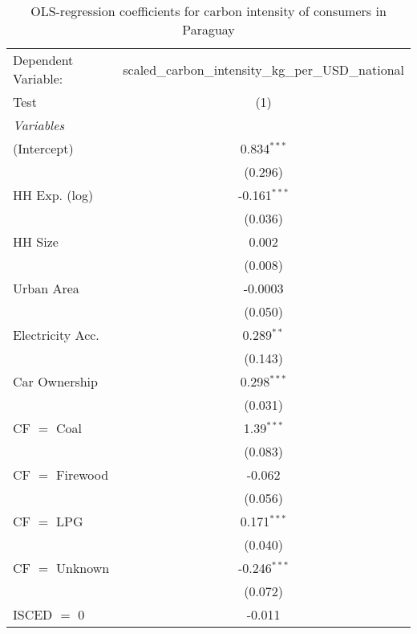 
\begin{table}[htbp!]
   \centering
   \small
   \begin{adjustbox}{width = 1\textwidth, max height = 0.95\textheight, center}
      \begin{threeparttable}[b]
         \caption{\label{tab:OLS_1_PRY} OLS-regression coefficients for carbon intensity of consumers in Paraguay}
         \begin{tabular}{lc}
            \tabularnewline \midrule \midrule
            Dependent Variable: & scaled\_carbon\_intensity\_kg\_per\_USD\_national\\        
            Test                & (1)\\  
            \midrule
            \emph{Variables}\\
            (Intercept)         & 0.834$^{***}$\\   
                                & (0.296)\\   
            HH Exp. (log)       & -0.161$^{***}$\\   
                                & (0.036)\\   
            HH Size             & 0.002\\   
                                & (0.008)\\   
            Urban Area          & -0.0003\\   
                                & (0.050)\\   
            Electricity Acc.    & 0.289$^{**}$\\   
                                & (0.143)\\   
            Car Ownership       & 0.298$^{***}$\\   
                                & (0.031)\\   
            CF $=$ Coal         & 1.39$^{***}$\\   
                                & (0.083)\\   
            CF $=$ Firewood     & -0.062\\   
                                & (0.056)\\   
            CF $=$ LPG          & 0.171$^{***}$\\   
                                & (0.040)\\   
            CF $=$ Unknown      & -0.246$^{***}$\\   
                                & (0.072)\\   
            ISCED $=$ 0         & -0.011\\   

\end{tabular}
\end{threeparttable}
\end{adjustbox}
\end{table}

